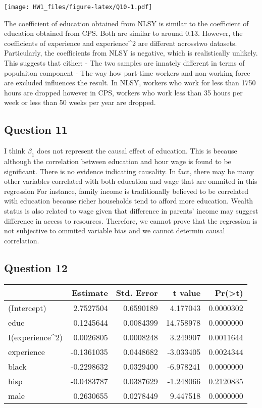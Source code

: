 \documentclass[
]{article}
\begin{document}
\texttt{[image: HW1\_files/figure-latex/Q10-1.pdf]}

The coefficient of education obtained from NLSY is similar to the
coefficient of education obtained from CPS. Both are similar to around
0.13. However, the coefficients of experience and experience\^{}2 are
different acrosstwo datasets. Particularly, the coefficients from NLSY
is negative, which is realistically unlikely. This suggests that either:
- The two samples are innately different in terms of populaiton
component - The way how part-time workers and non-working force are
excluded influences the result. In NLSY, workers who work for less than
1750 hours are dropped however in CPS, workers who work less than 35
hours per week or less than 50 weeks per year are dropped.

\hypertarget{question-11}{%
\subsection{Question 11}\label{question-11}}

I think \(\beta_1\) does not represent the causal effect of education.
This is because although the correlation between education and hour wage
is found to be significant. There is no evidence indicating causality.
In fact, there may be many other variables correlated with both
education and wage that are ommited in this regression For instance,
family income is traditionally believed to be correlated with education
because richer households tend to afford more education. Wealth status
is also related to wage given that difference in parents' income may
suggest difference in access to resources. Therefore, we cannot prove
that the regression is not subjective to ommited variable bias and we
cannot determin causal correlation.

\hypertarget{question-12}{%
\subsection{Question 12}\label{question-12}}

\begin{longtable}[]{@{}lrrrr@{}}
\toprule
& Estimate & Std. Error & t value &
Pr(\textgreater{}\textbar{}t\textbar{})\tabularnewline
\midrule
\endhead
(Intercept) & 2.7527504 & 0.6590189 & 4.177043 &
0.0000302\tabularnewline
educ & 0.1245644 & 0.0084399 & 14.758978 & 0.0000000\tabularnewline
I(experience\^{}2) & 0.0026805 & 0.0008248 & 3.249907 &
0.0011644\tabularnewline
experience & -0.1361035 & 0.0448682 & -3.033405 &
0.0024344\tabularnewline
black & -0.2298632 & 0.0329400 & -6.978241 & 0.0000000\tabularnewline
hisp & -0.0483787 & 0.0387629 & -1.248066 & 0.2120835\tabularnewline
male & 0.2630655 & 0.0278449 & 9.447518 & 0.0000000\tabularnewline
\bottomrule
\end{longtable}
\end{document}
